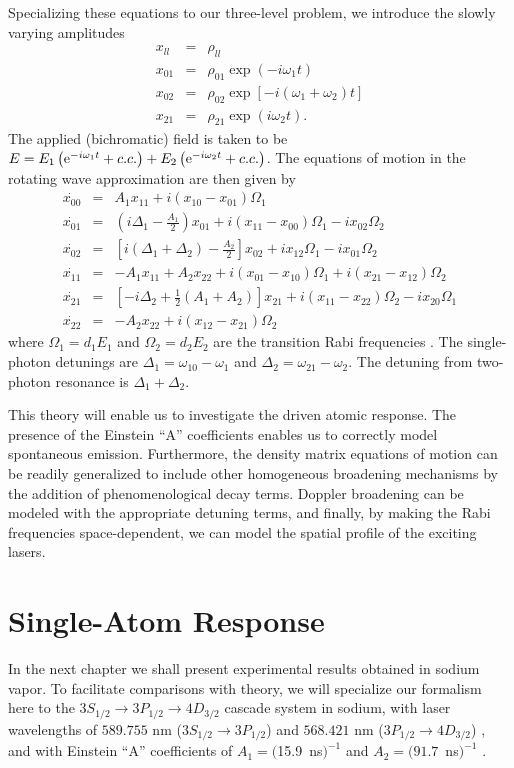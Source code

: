 Specializing these equations to our three-level problem, we introduce 
the slowly varying amplitudes
\begin{eqnarray}
x_{ll} & = & \rho_{ll} \\
x_{01} & = & \rho_{01}\exp(-i \omega_1 t) \\
x_{02} & = & \rho_{02}\exp\left[-i\left(\omega_1 + \omega_2\right)t\right] \\
x_{21} & = & \rho_{21}\exp(i\omega_2 t).
\end{eqnarray}
The applied (bichromatic) field is taken to be $E = E_1\left({\rm e}^{-i
\omega_1 t} + c.c.\right) + E_2\left({\rm e}^{-i\omega_2 t} + c.c.\right)$.
The equations of motion in the rotating wave approximation are then given by
\begin{eqnarray}
\dot{x_{00}} & = & A_1 x_{11} + i (x_{10} - x_{01})\Omega_1 \\
\dot{x_{01}} & = & \left(i\Delta_1 -\frac{A_1}{2}\right)x_{01} +
i (x_{11}-x_{00})\Omega_1 -i x_{02} \Omega_2 \\
\dot{x_{02}} & = & \left[i(\Delta_1+\Delta_2) - \frac{A_2}{2}\right]x_{02} +
i x_{12} \Omega_1 -i x_{01} \Omega_2 \\
\dot{x_{11}} & = & -A_1 x_{11} + A_2 x_{22}
+i (x_{01}-x_{10})\Omega_1 +i (x_{21}-x_{12})
\Omega_2 \\
\dot{x_{21}} & = & \left[-i\Delta_2 +\frac{1}{2}(A_1+A_2)\right]x_{21} +
i (x_{11}-x_{22})\Omega_2 - i x_{20}\Omega_1 \\
\dot{x_{22}} & = & -A_2 x_{22} + i (x_{12} - x_{21})\Omega_2
\end{eqnarray}
where $\Omega_1 = d_1 E_1$ and $\Omega_2 = d_2 E_2$ are the transition Rabi
frequencies . The single-photon detunings are $\Delta_1 = \omega_{10} -
\omega_1$ and $\Delta_2 = \omega_{21} - \omega_2$.  The detuning from
two-photon resonance is $\Delta_1 + \Delta_2$.

This theory will enable us to investigate the driven atomic response.  The
presence of the Einstein ``A'' coefficients enables us to correctly model
spontaneous emission.  Furthermore, the density matrix equations of motion can
be readily generalized to include other homogeneous broadening mechanisms by the
addition of phenomenological decay terms.  Doppler broadening can be modeled
with the appropriate detuning terms, and finally, by making the Rabi frequencies
space-dependent, we can model the spatial profile of the exciting lasers.

\section{Single-Atom Response}
\hspace{\parindent} In the next chapter we shall present experimental results
obtained in sodium vapor.  To facilitate comparisons with theory, we will
specialize our formalism here to the $3S_{1/2} \rightarrow
3P_{1/2} \rightarrow 4D_{3/2}$ cascade system in sodium, with laser
wavelengths of $589.755$ nm ($3S_{1/2} \rightarrow 3P_{1/2}$) and $568.421$
nm ($3P_{1/2} \rightarrow 4D_{3/2}$) \cite{Moore:71}, and with Einstein ``A''
coefficients of $A_1 = ($15.9~ns$)^{-1}$ and $A_2 = (91.7$~ns$)^{-1}$
\cite{Wiese:69}.

